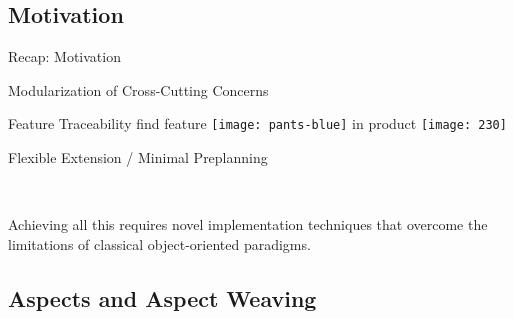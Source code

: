 \subsection{Motivation}

\begin{frame}{Recap: Motivation}
	\begin{mycolumns}[widths={50,50},animation=none]
		\begin{exampletight}{Modularization of Cross-Cutting Concerns}
			\centering
		\end{exampletight}
		\begin{example}{Feature Traceability}
			find feature \texttt{[image: pants-blue]} in product \texttt{[image: 230]}
		\end{example}
	\mynextcolumn
		\begin{exampletight}{Flexible Extension / Minimal Preplanning}
			\centering
		\end{exampletight}
		
		~
		
		\begin{note}{}
			Achieving all this requires novel implementation techniques that overcome the limitations of classical object-oriented paradigms.
		\end{note}
	\end{mycolumns}
\end{frame}

\subsection{Aspects and Aspect Weaving}

